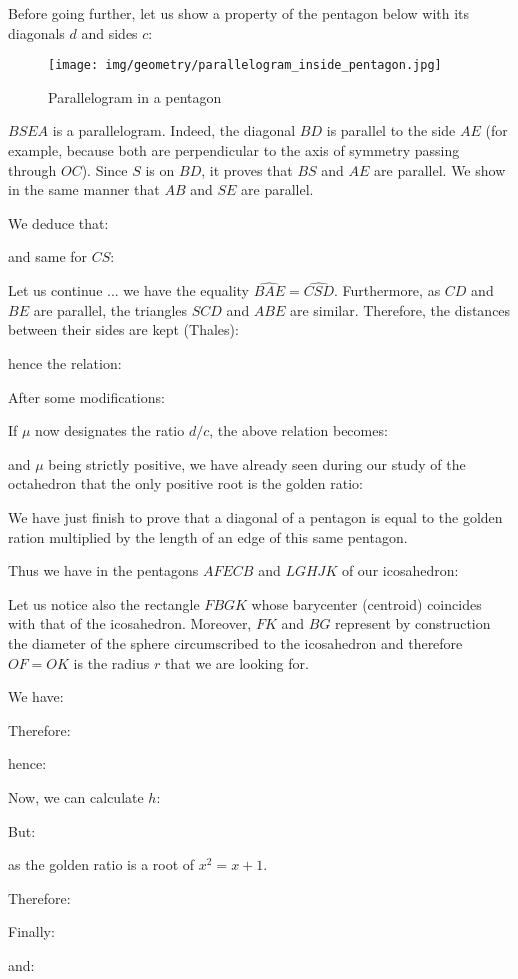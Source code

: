 {	Before going further, let us show a property of the pentagon below with its diagonals $d$ and sides $c$:
	\begin{figure}[H]
		\centering
		\texttt{[image: img/geometry/parallelogram\_inside\_pentagon.jpg]}
		\caption{Parallelogram in a pentagon}
	\end{figure}
	$BSEA$ is a parallelogram. Indeed, the diagonal $BD$ is parallel to the side $AE$ (for example, because both are perpendicular to the axis of symmetry passing through $OC$). Since $S$ is on $BD$, it proves that $BS$ and $AE$ are parallel. We show in the same manner that $AB$ and $SE$ are parallel.
	
	We deduce that:
	
	and same for $CS$:
	
	Let us continue ... we have the equality $\widehat{BAE}=\widehat{CSD}$. Furthermore, as $CD$ and $BE$ are parallel, the triangles $SCD$ and $ABE$ are similar. Therefore, the distances between their sides are kept (Thales):
	
	hence the relation:
	
	After some modifications:
	
	If $\mu$ now designates the ratio $d/c$, the above relation becomes:
	
	and $\mu$ being strictly positive, we have already seen during our study of the octahedron that the only positive root is the golden ratio:
	
	We have just finish to prove that a diagonal of a pentagon is equal to the golden ration multiplied by the length of an edge of this same pentagon.
	
	Thus we have in the pentagons $AFECB$ and $LGHJK$ of our icosahedron:
	
	Let us notice also the rectangle $FBGK$ whose barycenter (centroid) coincides with that of the icosahedron. Moreover, $FK$ and $BG$ represent by construction the diameter of the sphere circumscribed to the icosahedron and therefore $OF=OK$ is the radius $r$ that we are looking for.

	We have:
	
	Therefore:
	
	hence:
	
	Now, we can calculate $h$:
	
	But:
	
	as the golden ratio is a root of $x^2=x+1$.

	Therefore:
	
	Finally:
	
	and:
	
}
